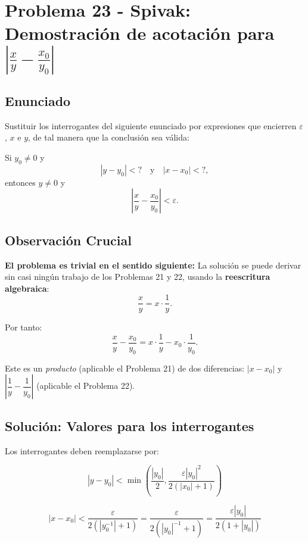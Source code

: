 
\section*{Problema 23 - Spivak: Demostración de acotación para $\left|\frac{x}{y} - \frac{x_0}{y_0}\right|$}

\subsection*{Enunciado}

Sustituir los interrogantes del siguiente enunciado por expresiones que encierren $\varepsilon$, $x$ e $y$, de tal manera que la conclusión sea válida:

\vspace{0.3cm}

Si $y_0 \neq 0$ y 
\[
|y - y_0| < ? \quad \text{y} \quad |x - x_0| < ?,
\]
entonces $y \neq 0$ y
\[
\left|\frac{x}{y} - \frac{x_0}{y_0}\right| < \varepsilon.
\]

\subsection*{Observación Crucial}

\textbf{El problema es trivial en el sentido siguiente:} La solución se puede derivar sin casi ningún trabajo de los Problemas 21 y 22, usando la \textbf{reescritura algebraica}:
\[
\frac{x}{y} = x \cdot \frac{1}{y}.
\]

Por tanto:
\[
\frac{x}{y} - \frac{x_0}{y_0} = x \cdot \frac{1}{y} - x_0 \cdot \frac{1}{y_0}.
\]

Este es un \textit{producto} (aplicable el Problema 21) de dos diferencias: $|x - x_0|$ y $\left|\dfrac{1}{y} - \dfrac{1}{y_0}\right|$ (aplicable el Problema 22).

\subsection*{Solución: Valores para los interrogantes}

Los interrogantes deben reemplazarse por:

\[
\boxed{|y - y_0| < \min\left(\frac{|y_0|}{2}, \frac{\varepsilon|y_0|^2}{2(|x_0|+1)}\right)}
\]

\[
\boxed{|x - x_0| < \frac{\varepsilon}{2(|y_0^{-1}|+1)} = \frac{\varepsilon}{2(|y_0|^{-1}+1)} = \frac{\varepsilon|y_0|}{2(1+|y_0|)}}
\]

